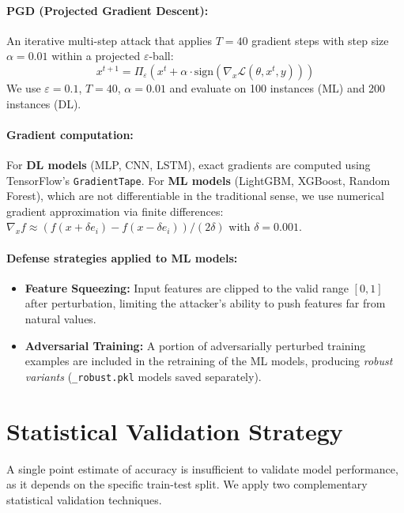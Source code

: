 \paragraph{PGD (Projected Gradient Descent):}
An iterative multi-step attack that applies $T=40$ gradient steps with step size $\alpha = 0.01$ within a projected $\varepsilon$-ball:
\begin{equation}
    x^{t+1} = \Pi_\varepsilon\left(x^t + \alpha \cdot \text{sign}\left(\nabla_x \mathcal{L}(\theta, x^t, y)\right)\right)
\end{equation}
We use $\varepsilon = 0.1$, $T = 40$, $\alpha = 0.01$ and evaluate on 100 instances (ML) and 200 instances (DL).

\paragraph{Gradient computation:}
For \textbf{DL models} (MLP, CNN, LSTM), exact gradients are computed using TensorFlow's \texttt{GradientTape}. For \textbf{ML models} (LightGBM, XGBoost, Random Forest), which are not differentiable in the traditional sense, we use numerical gradient approximation via finite differences: $\nabla_x f \approx (f(x + \delta e_i) - f(x - \delta e_i)) / (2\delta)$ with $\delta = 0.001$.

\paragraph{Defense strategies applied to ML models:}
\begin{itemize}
    \item \textbf{Feature Squeezing:} Input features are clipped to the valid range $[0, 1]$ after perturbation, limiting the attacker's ability to push features far from natural values.
    \item \textbf{Adversarial Training:} A portion of adversarially perturbed training examples are included in the retraining of the ML models, producing \textit{robust variants} (\texttt{\_robust.pkl} models saved separately).
\end{itemize}

\section{Statistical Validation Strategy}

A single point estimate of accuracy is insufficient to validate model performance, as it depends on the specific train-test split. We apply two complementary statistical validation techniques.

